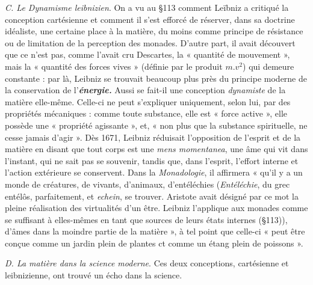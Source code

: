 {\it C. Le Dynamisme leibnizien}. On a vu au \S 113 comment Leïbniz
a critiqué la conception cartésienne et comment il s’est efforcé de
réserver, dans sa doctrine idéaliste, une certaine place à la matière,
du moins comme principe de résistance ou de limitation de la perception
des monades. D’autre part, il avait découvert que ce n’est pas,
comme l’avait cru Descartes, la « quantité de mouvement », mais la
« quantité des forces vives » (définie par le produit $m.v^2$) qui demeure
constante : par là, Leibniz se trouvait beaucoup plus près du principe
moderne de la conservation de l’\textbf{\textit {énergie.}} Aussi se fait-il une conception
{\it dynamiste} de la matière elle-même. Celle-ci ne peut s’expliquer uniquement,
selon lui, par des propriétés mécaniques : comme toute
substance, elle est « force active », elle possède une « propriété agissante »,
et, « non plus que la substance spirituelle, ne cesse jamais d’agir ». Dès
1671, Leibniz réduisait l’opposition de l'esprit et de la matière en
disant que tout corps est une {\it mens momentanea}, une âme qui vit dans
l'instant, qui ne sait pas se souvenir, tandis que, dans l'esprit, l’effort
interne et l’action extérieure se conservent. Dans la {\it Monadologie},
il affirmera « qu’il y a un monde de créatures, de vivants, d’animaux,
d’entéléchies
{\scriptsize ({\it Entéléchie}, du grec entélôs, parfaitement,
et {\it echein}, se trouver. Aristote avait
désigné par ce mot la pleine réalisation des virtualités d’un être. Leibniz l’applique aux
monades comme se suffisant à elles-mêmes en tant que sources de leurs états internes
(\S 113))},
d’âmes dans la moindre partie de la matière », à tel
point que celle-ci « peut être conçue comme un jardin plein de
plantes ct comme un étang plein de poissons ».

{\it D. La matière dans la science moderne}. Ces deux conceptions, cartésienne
et leibnizienne, ont trouvé un écho dans la science.


